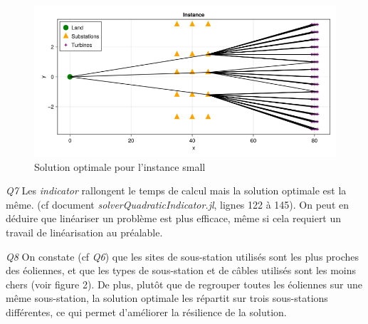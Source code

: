 \documentclass[a4paper,12pt]{article}
\begin{document}
\begin{figure}[h]
    \centering
    \includegraphics[scale=0.2]{small.png}
    \caption{Solution optimale pour l'instance small}
\end{figure}

\textit{Q7} Les \textit{indicator} rallongent le temps de calcul mais la solution optimale est la même. (cf document \textit{solverQuadraticIndicator.jl}, lignes 122 à 145). On peut en déduire que linéariser un problème est plus efficace, même si cela requiert un travail de linéarisation au préalable.

\textit{Q8}
On constate (cf \textit{Q6}) que les sites de sous-station utilisés sont les plus proches des éoliennes, et que les types de sous-station et de câbles utilisés sont les moins chers (voir figure 2).
De plus, plutôt que de regrouper toutes les éoliennes sur une même sous-station, la solution optimale les répartit sur trois sous-stations différentes, ce qui permet d'améliorer la résilience de la solution.
\end{document}
